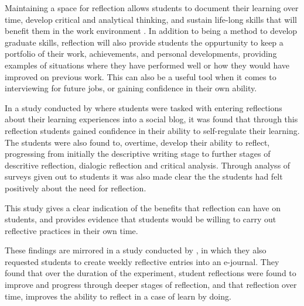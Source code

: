 \documentclass{l4proj}
\begin{document}
Maintaining a space for reflection allows students to document their learning over time, develop critical and analytical thinking, and 
sustain life-long skills that will benefit them in the work
environment \citep{mcdermott_developing_nodate}.  In addition to being a method to develop graduate skills, reflection will also provide students 
the oppurtunity to keep a portfolio of their work, achievements, and personal developments, providing examples of situations where they have performed
well or how they would have improved on previous work. This can also be a useful tool when it comes to interviewing for future jobs, or gaining 
confidence in their own ability. 

In a study conducted by \citet{mcdermott_developing_nodate} where students were tasked with entering reflections about their learning experiences into a 
social blog, it was found that through this reflection students gained confidence in their ability to self-regulate their learning. The students were also
found to, overtime, develop their ability to reflect, progressing from initially the descriptive writing stage to further stages of descritive reflection,
dialogic reflection and critical analysis. Through analyss of surveys given out to students it was also made clear the the students had felt 
positively about the need for reflection.

This study gives a clear indication of the benefits that reflection can have on students, and provides evidence that students would be willing to 
carry out reflective practices in their own time.

These findings are mirrored in a study conducted by \citet{bruno_reflective_2018}, in which they also requested students to create weekly reflective entries into 
an e-journal. They found that over the duration of the experiment, student reflections were found to improve and progress through deeper stages of 
reflection, and that reflection over time, improves the ability to reflect in a case of learn by doing. 
\end{document}
